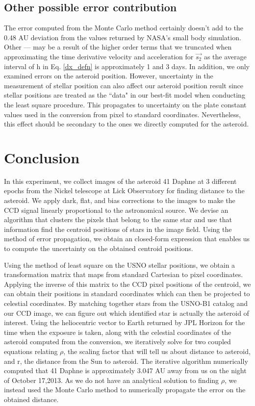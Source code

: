 \documentclass[authoryear, 12pt,5p, times]{elsarticle}
\begin{document}
\subsection{Other possible error contribution}
The error computed from the Monte Carlo method certainly doesn't add to the 0.48 AU deviation from the values returned by NASA's small body simulation. Other --- may be a result of the higher order terms that we truncated when approximating the time derivative velocity and acceleration for $\vec{s_2}$ as the average interval of h in Eq. \ref{dx_defn} is approximately 1 and 3 days. 
In addition,  we only examined errors on the asteroid position. However, uncertainty in the measurement of stellar position can also affect our asteroid position result since stellar positions are treated as the ``data" in our best-fit model when conducting the least square procedure. This propagates to uncertainty on the plate constant values used in the conversion from pixel to standard coordinates. Nevertheless, this effect should be secondary to the ones we directly computed for the asteroid. 
\section{Conclusion}
In this experiment, we collect images of the asteroid 41 Daphne at 3 different epochs from the Nickel telescope at Lick Observatory for finding distance to the asteroid. We apply dark, flat, and bias corrections to the images to make the CCD signal linearly proportional to the astronomical source. We devise an algorithm that clusters the pixels that belong to the same star and use that information find the centroid positions of stars in the image field. Using the method of error propagation, we obtain an closed-form expression that enables us to compute the uncertainty on the obtained centroid positions. 

Using the method of least square on the USNO stellar positions, we obtain a transformation matrix that maps from standard Cartesian to pixel coordinates. Applying the inverse of this matrix to the CCD pixel positions of the centroid, we can obtain their positions in standard coordinates which can then be projected to celestial coordinates. By matching together stars from the USNO-B1 catalog and our CCD image, we can figure out which identified star is actually the asteroid of interest. Using the heliocentric vector to Earth returned by JPL Horizon for the time when the exposure is taken, along with the celestial coordinates of the asteroid computed from the conversion, we iteratively solve for two coupled equations relating $\rho$, the scaling factor that will tell us about distance to asteroid, and r, the distance from the Sun to asteroid. The iterative algorithm numerically computed that 41 Daphne is approximately 3.047 AU away from us on the night of October 17,2013. As we do not have an analytical solution to finding $\rho$, we instead used the Monte Carlo method to numerically propagate the error on the obtained distance.
\end{document}
